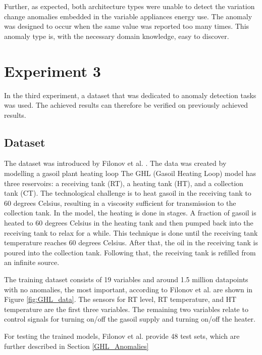 Further, as expected, both architecture types were unable to detect the variation change anomalies embedded in the variable appliances energy use. The anomaly was designed to occur when the same value was reported too many times. This anomaly type is, with the necessary domain knowledge, easy to discover.

\section{Experiment 3}
In the third experiment, a dataset that was dedicated to anomaly detection tasks was used. The achieved results can therefore be verified on previously achieved results.

\subsection{Dataset} \label{GHL_Dataset}
The dataset was introduced by Filonov et al. \parencite{Filonov2016}. The data was created by modelling a gasoil plant heating loop The GHL (Gasoil Heating Loop) model has three reservoirs: a receiving tank (RT), a heating tank (HT), and a collection tank (CT). The technological challenge is to heat gasoil in the receiving tank to 60 degrees Celsius, resulting in a viscosity sufficient for transmission to the collection tank. In the model, the heating is done in stages. A fraction of gasoil is heated to 60 degrees Celsius in the heating tank and then pumped back into the receiving tank to relax for a while. This technique is done until the receiving tank temperature reaches 60 degrees Celsius. After that, the oil in the receiving tank is poured into the collection tank. Following that, the receiving tank is refilled from an infinite source.

The training dataset consists of 19 variables and around 1.5 million datapoints with no anomalies, the most important, according to Filonov et al. \parencite{Filonov2016} are shown in Figure \ref{fig:GHL_data}. The sensors for RT level, RT temperature, and HT temperature are the first three variables. The remaining two variables relate to control signals for turning on/off the gasoil supply and turning on/off the heater.

For testing the trained models, Filonov et al. \parencite*{Filonov2016} provide 48 test sets, which are further described in Section \ref{GHL_Anomalies}

